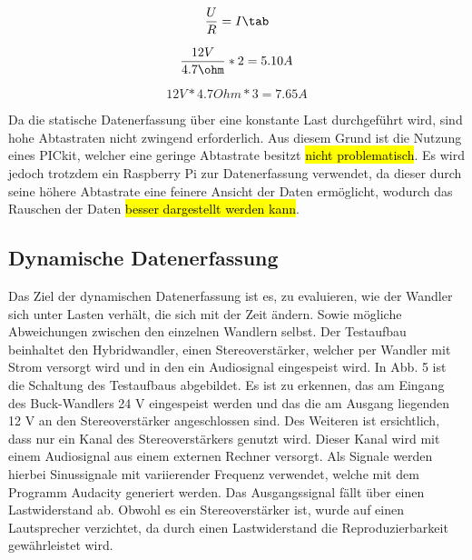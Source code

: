\begin{equation}
\label{Ohmsches Gesetz}
\frac{U}{R} = I \tab
\end{equation}


\begin{equation}
\label{Ohmsches Gesetz}
\frac{12V}{4.7 \ohm}*2 = 5.10 A 
\end{equation}


\begin{equation}
\label{Ohmsches Gesetz}
12V*4.7 Ohm*3 = 7.65 A 
\end{equation}


Da die statische Datenerfassung über eine konstante Last durchgeführt wird, sind hohe Abtastraten nicht zwingend erforderlich. Aus diesem Grund ist die Nutzung eines PICkit, welcher eine geringe Abtastrate besitzt \hl{nicht problematisch}. Es wird jedoch trotzdem ein Raspberry Pi zur Datenerfassung verwendet, da dieser durch seine höhere Abtastrate eine feinere Ansicht der Daten ermöglicht, wodurch das Rauschen der Daten \hl{besser dargestellt werden kann}. 

\subsection{Dynamische Datenerfassung}

Das Ziel der dynamischen Datenerfassung ist es, zu evaluieren, wie der Wandler sich unter Lasten verhält, die sich mit der Zeit ändern. Sowie mögliche Abweichungen zwischen den einzelnen Wandlern selbst. Der Testaufbau beinhaltet den Hybridwandler, einen Stereoverstärker, welcher per Wandler mit Strom versorgt wird und in den ein Audiosignal eingespeist wird. In Abb. 5 ist die Schaltung des Testaufbaus abgebildet. Es ist zu erkennen, das am Eingang des Buck-Wandlers 24 V eingespeist werden und das die am Ausgang liegenden 12 V an den Stereoverstärker angeschlossen sind. Des Weiteren ist ersichtlich, dass nur ein Kanal des Stereoverstärkers genutzt wird. Dieser Kanal wird mit einem Audiosignal aus einem externen Rechner versorgt. Als Signale werden hierbei Sinussignale mit variierender Frequenz verwendet, welche mit dem Programm Audacity generiert werden. Das Ausgangssignal fällt über einen Lastwiderstand ab. Obwohl es ein Stereoverstärker ist, wurde auf einen Lautsprecher verzichtet, da durch einen Lastwiderstand die Reproduzierbarkeit gewährleistet wird. 


